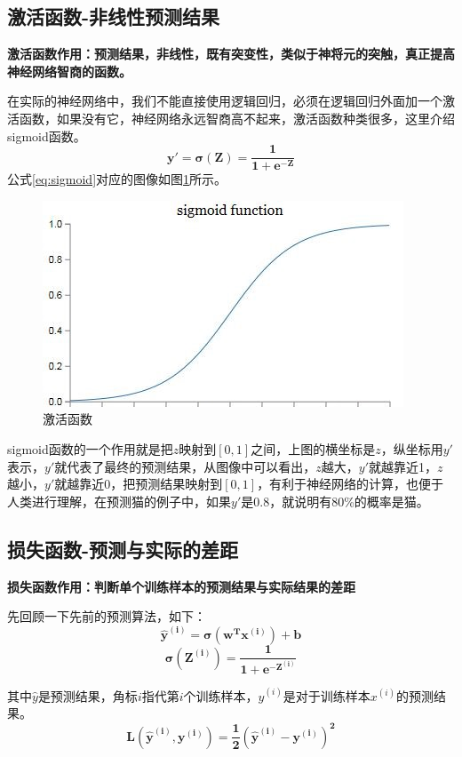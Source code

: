 \documentclass[UTF-8]{article} %
\begin{document}
	\subsection{激活函数-非线性预测结果}
	\textbf{激活函数作用：预测结果，非线性，既有突变性，类似于神将元的突触，真正提高神经网络智商的函数。}
	
	在实际的神经网络中，我们不能直接使用逻辑回归，必须在逻辑回归外面加一个激活函数，如果没有它，神经网络永远智商高不起来，激活函数种类很多，这里介绍sigmoid函数。
	\begin{equation}
		\bm{y' = \sigma (Z) = \frac{1}{1 + e^{-Z}}} \label{eq:sigmoid}
	\end{equation}
	公式\ref{eq:sigmoid}对应的图像如图\ref{fig:sigmoid}所示。

	\begin{figure}[htb]
		\centering
		\includegraphics[width=0.7\linewidth]{pictures/激活函数/sigmoid}
		\caption{激活函数}
		\label{fig:sigmoid}
	\end{figure}

	sigmoid函数的一个作用就是把$z$映射到$[0, 1]$之间，上图的横坐标是$z$，纵坐标用$y'$表示，$y'$就代表了最终的预测结果，从图像中可以看出，$z$越大，$y'$就越靠近1，$z$越小，$y'$就越靠近0，把预测结果映射到$[0, 1]$，有利于神经网络的计算，也便于人类进行理解，在预测猫的例子中，如果$y'$是0.8，就说明有80\%的概率是猫。

	\subsection{损失函数-预测与实际的差距}
	\textbf{损失函数作用：判断单个训练样本的预测结果与实际结果的差距}
	
	先回顾一下先前的预测算法，如下：	
	$$\bm{\hat{y}^{(i)} = \sigma (w^Tx^{(i)}) + b}$$
	$$\bm{\sigma (Z^{(i)}) = \frac{1}{1 + e^{-Z^{(i)}}}}$$
	
	其中$\hat{y}$是预测结果，角标$i$指代第$i$个训练样本，$\hat{y}^{(i)}$是对于训练样本$x^{(i)}$的预测结果。
	$$\bm{L(\hat{y}^{(i)}, y^{(i)}) = \frac{1}{2}(\hat{y}^{(i)} - y^{(i)})^2}$$
	
\end{document}
